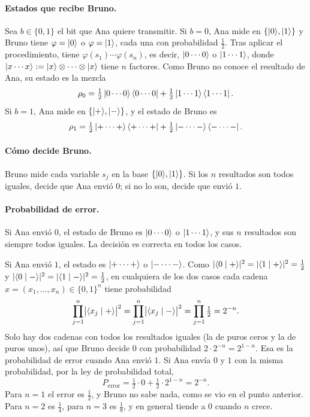 \paragraph{Estados que recibe Bruno.} Sea $b\in\{0,1\}$ el bit que Ana quiere transmitir. Si $b=0$, Ana mide en $\{\lvert 0\rangle,\lvert 1\rangle\}$ y Bruno tiene $\varphi=\lvert 0\rangle$ o $\varphi=\lvert 1\rangle$, cada una con probabilidad $\frac12$. Tras aplicar el procedimiento, tiene $\varphi(s_1)\cdots\varphi(s_n)$, es decir, $\lvert 0\cdots0\rangle$ o $\lvert 1\cdots1\rangle$, donde $\lvert x\cdots x\rangle:=\lvert x\rangle\otimes\cdots\otimes\lvert x\rangle$ tiene $n$ factores. Como Bruno no conoce el resultado de Ana, su estado es la mezcla
\[
  \rho_0=\tfrac12\,\lvert 0\cdots0\rangle\bra{0\cdots0}+\tfrac12\,\lvert 1\cdots1\rangle\bra{1\cdots1}.
\]
Si $b=1$, Ana mide en $\{\lvert +\rangle,\lvert -\rangle\}$, y el estado de Bruno es
\[
  \rho_1=\tfrac12\,\lvert +\cdots+\rangle\bra{+\cdots+}+\tfrac12\,\lvert -\cdots-\rangle\bra{-\cdots-}.
\]

\paragraph{Cómo decide Bruno.} Bruno mide cada variable $s_j$ en la base $\{\lvert 0\rangle,\lvert 1\rangle\}$. Si los $n$ resultados son todos iguales, decide que Ana envió $0$; si no lo son, decide que envió $1$.

\paragraph{Probabilidad de error.} Si Ana envió $0$, el estado de Bruno es $\lvert 0\cdots0\rangle$ o $\lvert 1\cdots1\rangle$, y sus $n$ resultados son siempre todos iguales. La decisión es correcta en todos los casos.

Si Ana envió $1$, el estado es $\lvert +\cdots+\rangle$ o $\lvert -\cdots-\rangle$. Como $|\langle 0\mid +\rangle|^2=|\langle 1\mid +\rangle|^2=\frac12$ y $|\langle 0\mid -\rangle|^2=|\langle 1\mid -\rangle|^2=\frac12$, en cualquiera de los dos casos cada cadena $x=(x_1,\dots,x_n)\in\{0,1\}^n$ tiene probabilidad
\[
  \prod_{j=1}^n\bigl|\langle x_j\mid +\rangle\bigr|^2=\prod_{j=1}^n\bigl|\langle x_j\mid -\rangle\bigr|^2=\prod_{j=1}^n\tfrac12=2^{-n}.
\]
Solo hay dos cadenas con todos los resultados iguales (la de puros ceros y la de puros unos), así que Bruno decide $0$ con probabilidad $2\cdot2^{-n}=2^{1-n}$. Esa es la probabilidad de error cuando Ana envió $1$. Si Ana envía $0$ y $1$ con la misma probabilidad, por la ley de probabilidad total,
\[
  P_{\text{error}}=\tfrac12\cdot 0+\tfrac12\cdot 2^{1-n}=2^{-n}.
\]
Para $n=1$ el error es $\frac12$, y Bruno no sabe nada, como se vio en el punto anterior. Para $n=2$ es $\frac14$, para $n=3$ es $\frac18$, y en general tiende a $0$ cuando $n$ crece.

